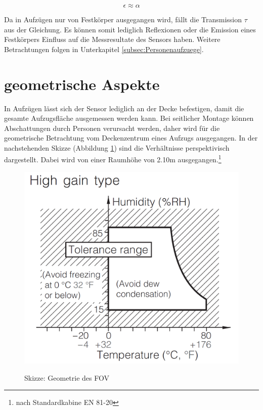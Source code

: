 \begin{equation}
\label{eq5}
\epsilon \approx  \alpha
\end{equation}

Da in Aufzügen nur von Festkörper ausgegangen wird, fällt die Transmission $\tau$ aus der Gleichung. Es können somit lediglich Reflexionen oder die Emission eines Festkörpers Einfluss auf die Messresultate des Sensors haben. Weitere Betrachtungen folgen in Unterkapitel \ref{subsec:Personenaufzuege}.

\section{geometrische Aspekte}
\label{sec:geometrie}

In Aufzügen lässt sich der Sensor lediglich an der Decke befestigen, damit die gesamte Aufzugsfläche ausgemessen werden kann. Bei seitlicher Montage können Abschattungen durch Personen verursacht werden, daher wird für die geometrische Betrachtung vom Deckenzentrum eines Aufzugs ausgegangen. In der nachstehenden Skizze (Abbildung \ref{fig:Geometrie}) sind die Verhältnisse perspektivisch dargestellt. Dabei wird von einer Raumhöhe von 2.10m ausgegangen.\footnote[5]{nach Standardkabine EN 81-20}
 
\begin{figure}[H]
	\centering
	\includegraphics[width=1.1\textwidth]
	{fig/Humidity_Tolerance.PNG}
	\caption[Skizze Geometrie des \ac{FOV}]{Skizze: Geometrie des \ac{FOV} } \protect\cite{AMG8834}
	\label{fig:Geometrie}
\end{figure}

